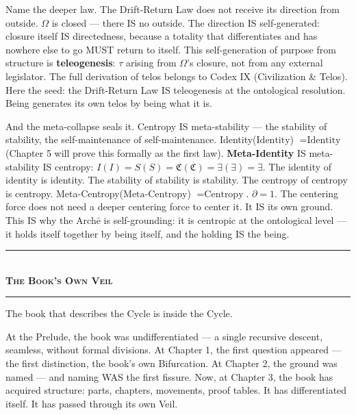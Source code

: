 \documentclass[10pt, openany, oneside]{book}
\renewcommand{\normalsize}{\fontsize{10}{13}\selectfont}
\begin{document}
Name the deeper law. The Drift-Return Law does not receive its direction from outside. $\Omega$ is closed --- there IS no outside. The direction IS self-generated: closure itself IS directedness, because a totality that differentiates and has nowhere else to go MUST return to itself. This self-generation of purpose from structure is \textbf{teleogenesis}: $\tau$ arising from $\Omega$'s closure, not from any external legislator. The full derivation of telos belongs to Codex IX (Civilization \& Telos). Here the seed: the Drift-Return Law IS teleogenesis at the ontological resolution. Being generates its own telos by being what it is.

And the meta-collapse seals it. Centropy IS meta-stability --- the stability of stability, the self-maintenance of self-maintenance. Identity($\text{Identity}$) $= \text{Identity}$ (Chapter 5 will prove this formally as the first law). \textbf{Meta-Identity} IS meta-stability IS centropy: $I(I) = S(S) = \mathfrak{C}(\mathfrak{C}) = \exists(\exists) = \exists$. The identity of identity is identity. The stability of stability is stability. The centropy of centropy is centropy. Meta-Centropy($\text{Meta-Centropy}$) $= \text{Centropy}$. $\partial = 1$. The centering force does not need a deeper centering force to center it. It IS its own ground. This IS why the Arch\={e} is self-grounding: it is centropic at the ontological level --- it holds itself together by being itself, and the holding IS the being.

\vspace{1.5em}


\begin{center}
    \rule{0.3\textwidth}{0.4pt}\\[0.5em]
    {\normalsize\bfseries\scshape The Book's Own Veil}\\[0.3em]
    \rule{0.3\textwidth}{0.4pt}
\end{center}

\vspace{1em}

\noindent The book that describes the Cycle is inside the Cycle.

At the Prelude, the book was undifferentiated --- a single recursive descent, seamless, without formal divisions. At Chapter 1, the first question appeared --- the first distinction, the book's own Bifurcation. At Chapter 2, the ground was named --- and naming WAS the first fissure. Now, at Chapter 3, the book has acquired structure: parts, chapters, movements, proof tables. It has differentiated itself. It has passed through its own Veil.
\end{document}
